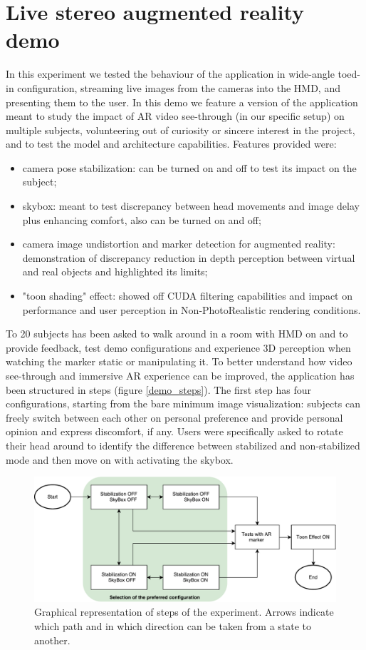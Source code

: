 \section{Live stereo augmented reality demo}
In this experiment we tested the behaviour of the application in wide-angle toed-in configuration, streaming live images from the cameras into the HMD, and presenting them to the user. In this demo we feature a version of the application meant to study the impact of AR video see-through (in our specific setup) on multiple subjects, volunteering out of curiosity or sincere interest in the project, and to test the model and architecture capabilities. Features provided were:
\begin{itemize}
\item camera pose stabilization: can be turned on and off to test its impact on the subject;
\item skybox: meant to test discrepancy between head movements and image delay plus enhancing comfort, also can be turned on and off;
\item camera image undistortion and marker detection for augmented reality: demonstration of discrepancy reduction in depth perception between virtual and real objects and highlighted its limits;
\item "toon shading" effect: showed off CUDA filtering capabilities and impact on performance and user perception in Non-PhotoRealistic rendering conditions.
\end{itemize}

To 20 subjects has been asked to walk around in a room with HMD on and to provide feedback, test demo configurations and experience 3D perception when watching the marker static or manipulating it. To better understand how video see-through and immersive AR experience can be improved, the application has been structured in steps (figure \ref{demo_steps}). The first step has four configurations, starting from the bare minimum image visualization: subjects can freely switch between each other on personal preference and provide personal opinion and express discomfort, if any. Users were specifically asked to rotate their head around to identify the difference between stabilized and non-stabilized mode and then move on with activating the skybox.

\begin{figure}
\centering
\includegraphics[width=\linewidth]{schemas/demosteps}
\caption{Graphical representation of steps of the experiment. Arrows indicate which path and in which direction can be taken from a state to another.}
\label{fig:demo_steps}
\end{figure}

